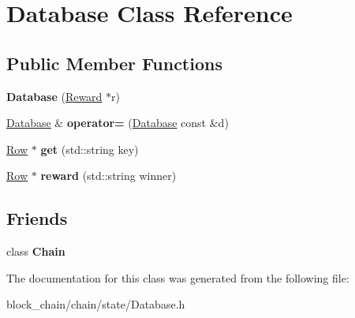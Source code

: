 \hypertarget{classDatabase}{}\section{Database Class Reference}
\label{classDatabase}
\subsection*{Public Member Functions}
\begin{DoxyCompactItemize}
\item 
\mbox{\label{classDatabase_ab00a6ec54927a6a80f5c09a926ee4611}} 
{\bfseries Database} (\mbox{\hyperlink{classReward}{Reward}} $\ast$r)
\item 
\mbox{\label{classDatabase_a53798837997415704f1ce331aa93eda9}} 
\mbox{\hyperlink{classDatabase}{Database}} \& {\bfseries operator=} (\mbox{\hyperlink{classDatabase}{Database}} const \&d)
\item 
\mbox{\label{classDatabase_a194c4d15c58a98ce7156afd33e64ae16}} 
\mbox{\hyperlink{classRow}{Row}} $\ast$ {\bfseries get} (std\+::string key)
\item 
\mbox{\label{classDatabase_a3e8f5125a0db0c76d35bd4a36894e203}} 
\mbox{\hyperlink{classRow}{Row}} $\ast$ {\bfseries reward} (std\+::string winner)
\end{DoxyCompactItemize}
\subsection*{Friends}
\begin{DoxyCompactItemize}
\item 
\mbox{\label{classDatabase_a65813570c30a3e0656fa523793ff1b86}} 
class {\bfseries Chain}
\end{DoxyCompactItemize}


The documentation for this class was generated from the following file\+:\begin{DoxyCompactItemize}
\item 
block\+\_\+chain/chain/state/Database.\+h\end{DoxyCompactItemize}
